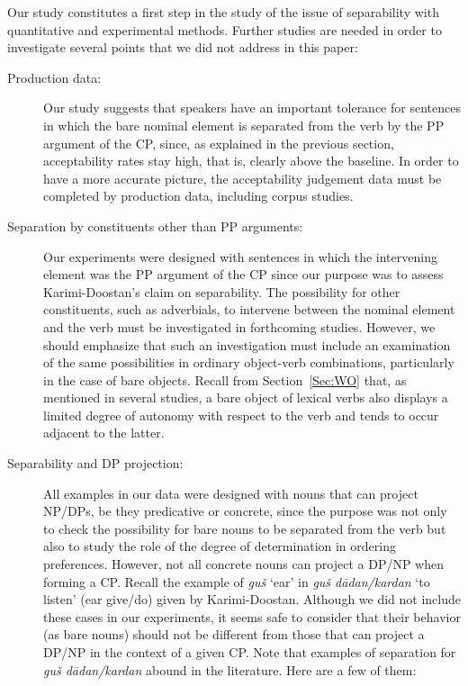 \documentclass[output=paper]{langsci/langscibook}
\begin{document}
Our study constitutes a first step in the study of the issue of separability with quantitative and experimental methods. Further studies are needed in order to investigate several points that we did not address in this paper: 

\begin{description}
\item[Production data:] Our study suggests that speakers have an important tolerance for sentences in which the bare nominal element is separated from the verb by the PP argument of the CP, since, as explained in the previous section, acceptability rates stay high, that is, clearly above the baseline. In order to have a more accurate picture, the acceptability judgement data must be completed by production data, including corpus studies. 

\item[Separation by constituents other than PP arguments:]
  \begin{sloppypar}
    Our experiments were designed with sentences in which the
    intervening element was the PP argument of the CP since our
    purpose was to assess Karimi-Doostan's claim on separability. The
    possibility for other constituents, such as adverbials, to
    intervene between the nominal element and the verb must be
    investigated in forthcoming studies. However, we should emphasize
    that such an investigation must include an examination of the same
    possibilities in ordinary object-verb combinations, particularly
    in the case of bare objects. Recall from Section~\ref{Sec:WO}
    that, as mentioned in several studies, a bare object of lexical
    verbs also displays a limited degree of autonomy with respect to
    the verb and tends to occur adjacent to the latter.
  \end{sloppypar}
\item[Separability and DP projection:]
  \begin{sloppypar}
    All examples in our data were designed with nouns that can project
    NP/DPs, be they predicative or concrete, since the purpose was not
    only to check the possibility for bare nouns to be separated from
    the verb but also to study the role of the degree of determination
    in ordering preferences. However, not all concrete nouns can
    project a DP/NP when forming a CP. Recall the example of
    \textit{gu\v{s}} `ear' in \textit{gu\v{s} d\=adan/kardan} `to
    listen' (ear give/do) given by Karimi-Doostan. Although we did not
    include these cases in our experiments, it seems safe to consider
    that their behavior (as bare nouns) should not be different from
    those that can project a DP/NP in the context of a given CP. Note
    that examples of separation for \textit{gu\v{s} d\=adan/kardan}
    abound in the literature. Here are a few of them:
  \end{sloppypar}

\end{description}
\end{document}
